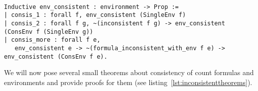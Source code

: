 \lstset{language=Coq}
\begin{lstlisting}[frame=single, caption={Inconsistent Environment}, label={lst:inconsistentenv}]

Inductive env_consistent : environment -> Prop :=
| consis_1 : forall f, env_consistent (SingleEnv f)
| consis_2 : forall f g, ~(inconsistent f g) -> env_consistent (ConsEnv f (SingleEnv g))
| consis_more : forall f e, 
   env_consistent e -> ~(formula_inconsistent_with_env f e) -> env_consistent (ConsEnv f e).

\end{lstlisting}


We will now pose several small theorems about consistency of count formulas and environments and provide proofs for them (see listing~\ref{lst:inconsistenttheorems}).

\lstset{language=Coq}
